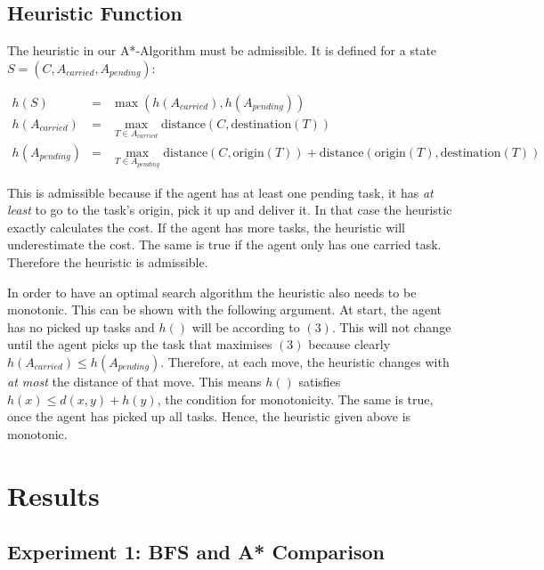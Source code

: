 \documentclass[11pt]{article}
\begin{document}
\subsection{Heuristic Function}
The heuristic in our A*-Algorithm must be admissible. It is defined for a state 
$S = (C, A_{carried}, A_{pending})$:

\begin{eqnarray}
h(S) &=& \max (h(A_{carried}), h(A_{pending}))  
\\
h(A_{carried}) &=& \max_{T \in A_{carried}} \text{distance}(C, \text{destination}(T))
\\
h(A_{pending}) &=& \max_{T \in A_{pending}} \text{distance}(C, \text{origin}(T)) + 
\text{distance}(\text{origin}(T), \text{destination}(T))
\end{eqnarray}

This is admissible because if the agent has at least one pending task, it has \textit{at least}
to go to the task's origin, pick it up and deliver it. In that case the heuristic exactly 
calculates the cost. If the agent has more tasks, the heuristic will underestimate the cost. 
The same is true if the agent only has one carried task. Therefore the heuristic 
is admissible.

In order to have an optimal search algorithm the heuristic also needs to be 
monotonic. This can be shown with the following argument. At start, the agent 
has no picked up tasks and $h()$ will be according to $(3)$. This will not change 
until the agent picks up the task that maximises $(3)$ because clearly
$h(A_{carried}) \leq h(A_{pending}) $. Therefore, at each move, the heuristic changes with 
\textit{at most} the distance of that move. This means $h()$ satisfies 
$h(x) \leq d(x, y) + h(y)$, the condition for monotonicity. The same is true, once the agent has 
picked up all tasks. Hence, the heuristic given above is monotonic.


\section{Results}

\subsection{Experiment 1: BFS and A* Comparison}
\end{document}
